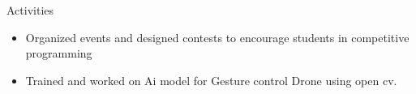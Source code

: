 \documentclass{resume} %
\begin{document}
\begin{workSection}{Activities}
     \customItem[
        title=BitByte Go(Vcet),
        keyHighlight=Multiple leadership roles,
        duration=Dec 2022– Present
    ]
     \begin{itemize}
        \vspace{-0.5em}
        \itemsep -6pt {} 
        \item Organized events and designed contests to encourage students in competitive programming
     \end{itemize}

      \customItem[
        title=Airnova(Vcet),
        keyHighlight=Multiple roles,
        duration=Dec 2020– May 2022
    ]
     \begin{itemize}
        \vspace{-0.5em}
        \itemsep -6pt {} 
        \item Trained and worked on Ai model for Gesture control Drone using open cv.

     \end{itemize}
\end{workSection}
\end{document}
